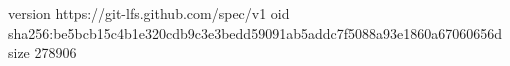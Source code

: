 version https://git-lfs.github.com/spec/v1
oid sha256:be5bcb15c4b1e320cdb9c3e3bedd59091ab5addc7f5088a93e1860a67060656d
size 278906
